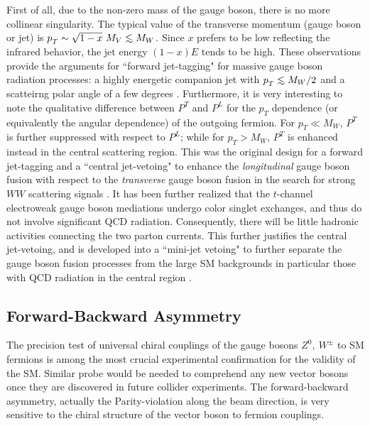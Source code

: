 \documentclass[prd,aps,floats,preprintnumbers,preprint,superscriptaddress,floatfix,nofootinbib]{revtex4}
\def\lsim{\mathrel{\raise.3ex\hbox{$<$\kern-.75em\lower1ex\hbox{$\sim$}}}}
\def\pt{p_T^{}}
\begin{document}
First of all, 
due to the non-zero mass of the gauge boson, there is no more collinear
singularity. The typical value of the transverse momentum 
 (gauge boson or jet)  is $\pt \sim \sqrt{1-x}\ M_V \lsim M_W$. 
Since $x$ prefers to be low reflecting the infrared behavior, 
the jet energy $(1-x)E$ tends to be high.
These observations provide the arguments for ``forward jet-tagging" 
for massive gauge boson radiation processes: a highly energetic 
companion  jet with $\pt \lsim M_W/2$ and a scatteirng polar angle of a few 
degrees \cite{jettag}.  Furthermore, it  is very interesting to note 
the qualitative difference between  $P^T$ and $P^L$ for the $\pt$ dependence
(or equivalently the angular dependence) of the outgoing fermion.
For $\pt \ll M_W$, $P^T$ is further suppressed with respect to $P^L$;
while for $\pt > M_W$, $P^T$ is enhanced instead in the central scattering
region. This was the
original design for a forward jet-tagging and a 
``central jet-vetoing"  \cite{tagveto} to enhance the 
{\it longitudinal} gauge boson
fusion with respect to the {\it transverse} gauge boson fusion in the search
for strong $WW$ scattering signals \cite{baggeretal}. 
It has been further realized that the $t$-channel electroweak 
gauge boson  mediations
undergo color singlet exchanges, and thus do not involve significant QCD 
radiation. Consequently, there will be little hadronic activities connecting
the two parton currents. This further justifies the central jet-vetoing, and 
is developed into a ``mini-jet vetoing" to further
separate the gauge boson fusion processes from the large SM backgrounds
in particular those with QCD radiation in the central region \cite{dieter}.


\subsection{Forward-Backward Asymmetry}
The precision test  of universal chiral couplings of 
the gauge bosons  $Z^0,\ W^\pm$ to SM fermions is among the most
 crucial experimental confirmation for the validity of the SM.
Similar probe would be needed to comprehend any new vector bosons 
once they are discovered in future collider experiments.
The forward-backward asymmetry, actually the Parity-violation along the
beam direction, is very sensitive to the chiral structure of the vector boson 
to fermion couplings. 
\end{document}
